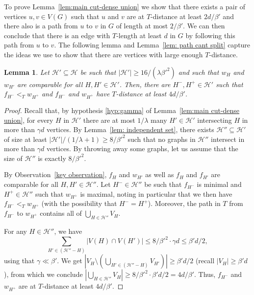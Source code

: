 \documentclass[10pt]{article}
\newtheorem{lemma}[theorem]{Lemma}
\theoremstyle{definition}
\let\leq\leqslant
\let\geq\geqslant
\begin{document}
To prove Lemma~\ref{lem:main cut-dense union} we show that there exists a pair of vertices $u,v\in V(G)$ such that $u$ and $v$ are at $T$-distance at least $2d/\beta'$ and there also is a path from $u$ to $v$ in $G$ of length at most $2/\beta'$. We can then conclude that there is an edge with $T$-length at least $d$ in $G$ by following this path from $u$ to $v$.
The following lemma and Lemma~\ref{lem: path cant split} capture the ideas we use to show that there are vertices with large enough $T$-distance. 
\begin{lemma}\label{lem: long path in T}
    Let $\mathcal H'\subseteq \mathcal H$ be such that $|\mathcal{H}'|\geq 16/(\lambda \beta'^2 )$ and such that $w_H$ and $w_{H'}$ are comparable for all $H,H'\in\mathcal H'$. Then, there are $H^-,H^+\in \mathcal H'$ such that $f_{H^-}<_T w_{H^+}$ and $f_{H^-}$ and $w_{H^+}$ have $T$-distance at least $4d/\beta' $.
\end{lemma}
\begin{proof}
    Recall that, by hypothesis \ref{hyp:gamma} of Lemma~\ref{lem:main cut-dense union}, for every $H$ in $\mathcal H'$ there are at most $1/\lambda$ many $H'\in\mathcal H'$ intersecting $H$ in more than $\gamma d$ vertices. By Lemma~\ref{lem: independent set}, there exists $\mathcal H''\subseteq\mathcal H'$ of size at least $|\mathcal H'|/(1/\lambda +1)\geq 8/\beta'^2$ such that no graphs in $\mathcal H''$ intersect in more than $\gamma d$ vertices. By throwing away some graphs, let us assume that the size of $\mathcal H''$ is exactly $8/\beta'^2$. 
    
    By Observation~\ref{key observation}, $f_H$ and $w_{H'}$ as well as $f_H$ and $f_{H'}$ are comparable for all $H,H'\in\mathcal H''$. Let $H^-\in\mathcal H''$ be such that $f_{H^-}$ is minimal and $H^+\in\mathcal H''$ such that $w_{H^+}$ is maximal, noting in particular that we then have $f_{H^-}<_T w_{H^+}$ (with the possibility that $H^-=H^+$). Moreover, the path in $T$ from $f_{H^-}$ to $w_{H^+}$ contains all of $\bigcup_{H\in\mathcal H''}V_{H}$. 
    
    For any $H\in\mathcal H''$, we have
    $$
    \sum_{H'\in(\mathcal H''-H)}|V(H)\cap V(H')|\leq 8/\beta'^2\cdot\gamma d\leq \beta' d/2,
    $$
    using that $\gamma \ll \beta'$.
    We get $|V_{H}\setminus (\bigcup_{H'\in (\mathcal H''-H)}V_{H'})|\geq \beta'  d/2$ (recall $|V_H|\geq \beta' d$), from which we conclude $|\bigcup_{H\in\mathcal H''}V_{H}|\geq 8/\beta'^2\cdot \beta' d/2= 4d/\beta'$. Thus, $f_{H^-}$ and $w_{H^+}$ are at $T$-distance at least $4d/\beta' $.
\end{proof}
 
\end{document}
